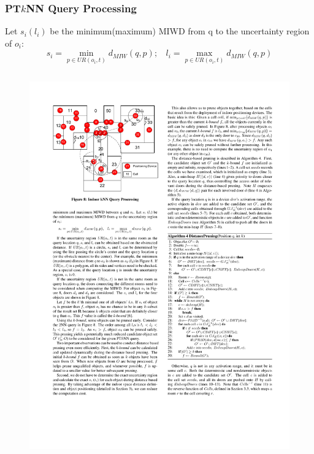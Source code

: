 
\begin{frame}
\frametitle{PT$k$NN Query Processing}

\footnotesize{
Let ${s_i (l_i)}$ be the minimum(maximum) MIWD from q to the uncertainty region of ${o_i}$:
\pause
\begin{equation}
  {s_i = \min_{p \in UR(o_i,t)} d_{MIW}(q, p);~~~~l_i = \max_{p \in UR(o_i,t)} d_{MIW}(q, p)}
\end{equation}
}

\begin{columns}[c]

\begin{figure}[tb]
  \includegraphics[width=\columnwidth]{figures/2-3/2-3-8.pdf}
\end{figure}


\end{columns}
\end{frame}
